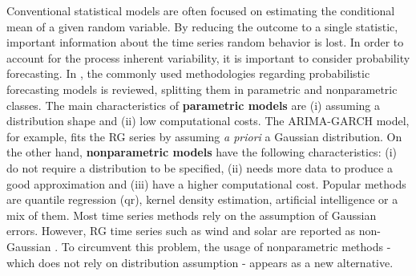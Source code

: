 
Conventional statistical models are often focused on estimating the conditional mean of a given random variable. %
By reducing the outcome to a single statistic, important information about the time series random behavior is lost. In order to account for the process inherent variability, it is important to consider probability forecasting.
In \cite{zhang_review_2014}, the commonly used methodologies regarding probabilistic forecasting models is reviewed, splitting them in parametric and nonparametric classes. The main characteristics of \textbf{parametric models} are (i) assuming a distribution shape and (ii) low computational costs. The ARIMA-GARCH model, for example, fits the RG series by assuming \textit{a priori} a Gaussian distribution. On the other hand, \textbf{nonparametric models} have the following characteristics: (i) do not require a distribution to be specified, (ii) needs more data to produce a good approximation and (iii) have a higher computational cost. Popular methods are quantile regression (qr), kernel density estimation,  artificial intelligence or a mix of them.
Most time series methods rely on the assumption of Gaussian errors. However, RG time series such as wind and solar are reported as non-Gaussian \cite{bessa2012time,jeon2012using,taylor2015forecasting,Wan2017}. To circumvent this problem, the usage of nonparametric methods - which does not rely on distribution assumption - appears as a new alternative. 

